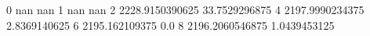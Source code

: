 0 nan nan
1 nan nan
2 2228.9150390625 33.7529296875
4 2197.9990234375 2.8369140625
6 2195.162109375 0.0
8 2196.2060546875 1.0439453125
